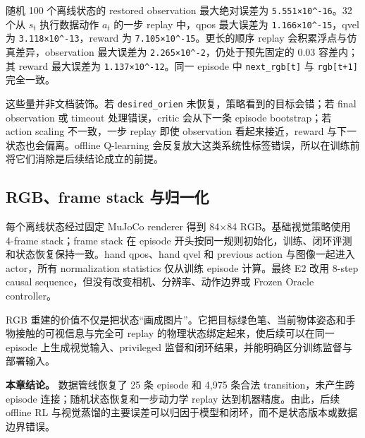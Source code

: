随机 100 个离线状态的 restored observation 最大绝对误差为 \texttt{5.551×10\^{}-16}。32 个从 \(s_t\) 执行数据动作 \(a_t\) 的一步 replay 中，qpos 最大误差为 \texttt{1.166×10\^{}-15}，qvel 为 \texttt{3.118×10\^{}-13}，reward 为 \texttt{7.105×10\^{}-15}。更长的顺序 replay 会积累浮点与仿真差异，observation 最大误差为 \texttt{2.265×10\^{}-2}，仍处于预先固定的 0.03 容差内；其 reward 最大误差为 \texttt{1.137×10\^{}-12}。同一 episode 中 \texttt{next\_rgb{[}t{]}} 与 \texttt{rgb{[}t+1{]}} 完全一致。

这些量并非文档装饰。若 \texttt{desired\_orien} 未恢复，策略看到的目标会错；若 final observation 或 timeout 处理错误，critic 会从下一条 episode bootstrap；若 action scaling 不一致，一步 replay 即使 observation 看起来接近，reward 与下一状态也会偏离。offline Q-learning 会反复放大这类系统性标签错误，所以在训练前将它们消除是后续结论成立的前提。

\hypertarget{rgbframe-stack-ux4e0eux5f52ux4e00ux5316}{%
\subsection{RGB、frame stack 与归一化}\label{rgbframe-stack-ux4e0eux5f52ux4e00ux5316}}

每个离线状态经过固定 MuJoCo renderer 得到 84×84 RGB。基础视觉策略使用 4-frame stack；frame stack 在 episode 开头按同一规则初始化，训练、闭环评测和状态恢复保持一致。hand qpos、hand qvel 和 previous action 与图像一起进入 actor，所有 normalization statistics 仅从训练 episode 计算。最终 E2 改用 8-step causal sequence，但没有改变相机、分辨率、动作边界或 Frozen Oracle controller。

RGB 重建的价值不仅是把状态``画成图片''。它把目标绿色笔、当前物体姿态和手物接触的可视信息与完全可 replay 的物理状态绑定起来，使后续可以在同一 episode 上生成视觉输入、privileged 监督和闭环结果，并能明确区分训练监督与部署输入。

\textbf{本章结论。} 数据管线恢复了 25 条 episode 和 4,975 条合法 transition，未产生跨 episode 连接；随机状态恢复和一步动力学 replay 达到机器精度。由此，后续 offline RL 与视觉蒸馏的主要误差可以归因于模型和闭环，而不是状态版本或数据边界错误。
